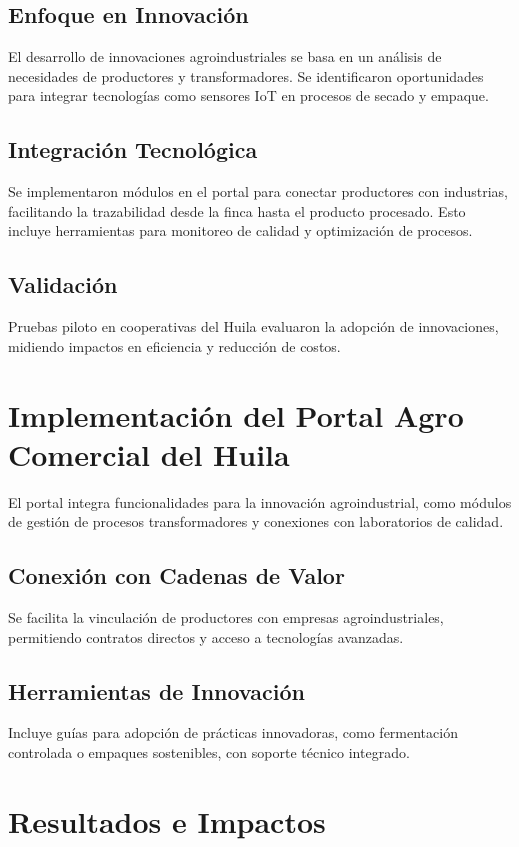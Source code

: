 \subsection{Enfoque en Innovación}
El desarrollo de innovaciones agroindustriales se basa en un análisis de necesidades de productores y transformadores. Se identificaron oportunidades para integrar tecnologías como sensores IoT en procesos de secado y empaque.

\subsection{Integración Tecnológica}
Se implementaron módulos en el portal para conectar productores con industrias, facilitando la trazabilidad desde la finca hasta el producto procesado. Esto incluye herramientas para monitoreo de calidad y optimización de procesos.

\subsection{Validación}
Pruebas piloto en cooperativas del Huila evaluaron la adopción de innovaciones, midiendo impactos en eficiencia y reducción de costos.

\section{Implementación del Portal Agro Comercial del Huila}

El portal integra funcionalidades para la innovación agroindustrial, como módulos de gestión de procesos transformadores y conexiones con laboratorios de calidad.

\subsection{Conexión con Cadenas de Valor}
Se facilita la vinculación de productores con empresas agroindustriales, permitiendo contratos directos y acceso a tecnologías avanzadas.

\subsection{Herramientas de Innovación}
Incluye guías para adopción de prácticas innovadoras, como fermentación controlada o empaques sostenibles, con soporte técnico integrado.

\section{Resultados e Impactos}

